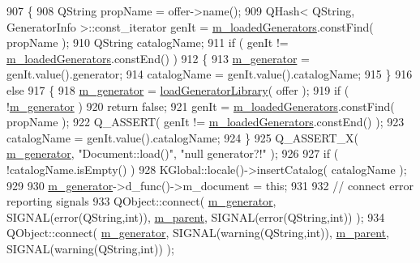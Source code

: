 \begin{DoxyCode}
907 \{
908     QString propName = offer->name();
909     QHash< QString, GeneratorInfo >::const\_iterator genIt = \hyperlink{classOkular_1_1DocumentPrivate_a449d3ae52e95d649dba62225f20a4195}{m\_loadedGenerators}.constFind(
       propName );
910     QString catalogName;
911     \textcolor{keywordflow}{if} ( genIt != \hyperlink{classOkular_1_1DocumentPrivate_a449d3ae52e95d649dba62225f20a4195}{m\_loadedGenerators}.constEnd() )
912     \{
913         \hyperlink{classOkular_1_1DocumentPrivate_a52083f79ce95756ddea060e74315e91f}{m\_generator} = genIt.value().generator;
914         catalogName = genIt.value().catalogName;
915     \}
916     \textcolor{keywordflow}{else}
917     \{
918         \hyperlink{classOkular_1_1DocumentPrivate_a52083f79ce95756ddea060e74315e91f}{m\_generator} = \hyperlink{classOkular_1_1DocumentPrivate_ac7c902ff8d869394318ffe7b28ff1336}{loadGeneratorLibrary}( offer );
919         \textcolor{keywordflow}{if} ( !\hyperlink{classOkular_1_1DocumentPrivate_a52083f79ce95756ddea060e74315e91f}{m\_generator} )
920             \textcolor{keywordflow}{return} \textcolor{keyword}{false};
921         genIt = \hyperlink{classOkular_1_1DocumentPrivate_a449d3ae52e95d649dba62225f20a4195}{m\_loadedGenerators}.constFind( propName );
922         Q\_ASSERT( genIt != \hyperlink{classOkular_1_1DocumentPrivate_a449d3ae52e95d649dba62225f20a4195}{m\_loadedGenerators}.constEnd() );
923         catalogName = genIt.value().catalogName;
924     \}
925     Q\_ASSERT\_X( \hyperlink{classOkular_1_1DocumentPrivate_a52083f79ce95756ddea060e74315e91f}{m\_generator}, \textcolor{stringliteral}{"Document::load()"}, \textcolor{stringliteral}{"null generator?!"} );
926 
927     \textcolor{keywordflow}{if} ( !catalogName.isEmpty() )
928         KGlobal::locale()->insertCatalog( catalogName );
929 
930     \hyperlink{classOkular_1_1DocumentPrivate_a52083f79ce95756ddea060e74315e91f}{m\_generator}->d\_func()->m\_document = \textcolor{keyword}{this};
931 
932     \textcolor{comment}{// connect error reporting signals}
933     QObject::connect( \hyperlink{classOkular_1_1DocumentPrivate_a52083f79ce95756ddea060e74315e91f}{m\_generator}, SIGNAL(error(QString,\textcolor{keywordtype}{int})), 
      \hyperlink{classOkular_1_1DocumentPrivate_ac921eda41c014869ffec96ecc569c713}{m\_parent}, SIGNAL(error(QString,\textcolor{keywordtype}{int})) );
934     QObject::connect( \hyperlink{classOkular_1_1DocumentPrivate_a52083f79ce95756ddea060e74315e91f}{m\_generator}, SIGNAL(warning(QString,\textcolor{keywordtype}{int})), 
      \hyperlink{classOkular_1_1DocumentPrivate_ac921eda41c014869ffec96ecc569c713}{m\_parent}, SIGNAL(warning(QString,\textcolor{keywordtype}{int})) );

\end{DoxyCode}
